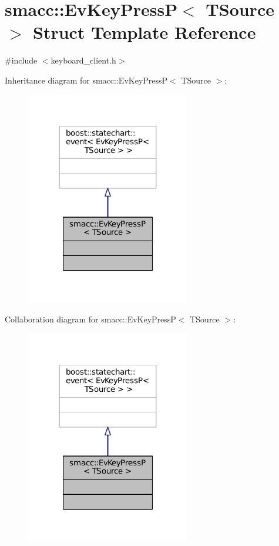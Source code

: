 \hypertarget{structsmacc_1_1EvKeyPressP}{}\section{smacc\+:\+:Ev\+Key\+PressP$<$ T\+Source $>$ Struct Template Reference}
\label{structsmacc_1_1EvKeyPressP}


{\ttfamily \#include $<$keyboard\+\_\+client.\+h$>$}



Inheritance diagram for smacc\+:\+:Ev\+Key\+PressP$<$ T\+Source $>$\+:
\nopagebreak
\begin{figure}[H]
\begin{center}
\leavevmode
\includegraphics[width=203pt]{structsmacc_1_1EvKeyPressP__inherit__graph}
\end{center}
\end{figure}


Collaboration diagram for smacc\+:\+:Ev\+Key\+PressP$<$ T\+Source $>$\+:
\nopagebreak
\begin{figure}[H]
\begin{center}
\leavevmode
\includegraphics[width=203pt]{structsmacc_1_1EvKeyPressP__coll__graph}
\end{center}
\end{figure}


